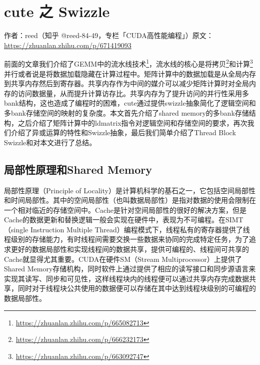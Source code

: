 \chapter{cute 之 Swizzle}

\begin{center}\small 作者：reed（知乎 @reed-84-49，专栏「CUDA高性能编程」）\quad 原文：\url{https://zhuanlan.zhihu.com/p/671419093}\end{center}

前面的文章我们介绍了GEMM中的流水线技术\footnote{\url{https://zhuanlan.zhihu.com/p/665082713}}，流水线的核心是将拷贝\footnote{\url{https://zhuanlan.zhihu.com/p/666232173}}和计算\footnote{\url{https://zhuanlan.zhihu.com/p/663092747}}并行或者说是将数据加载隐藏在计算过程中。矩阵计算中的数据加载是从全局内存到共享内存然后到寄存器。共享内存作为中间的媒介可以减少矩阵计算时对全局内存的访问数据量，从而提升计算访存比。共享内存为了提升访问的并行性采用多bank结构，这也造成了编程时的困难，cute通过提供swizzle抽象简化了逻辑空间和多bank存储空间的映射的复杂度。本文首先介绍了shared memory的多bank存储结构，之后介绍了矩阵计算中的ldmatrix指令对逻辑空间和存储空间的要求，再次我们介绍了异或运算的特性和Swizzle抽象，最后我们简单介绍了Thread Block Swizzle和对本文进行了总结。

\section{局部性原理和Shared Memory}

局部性原理（Principle of Locality）是计算机科学的基石之一，它包括空间局部性和时间局部性。其中的空间局部性（也叫数据局部性）是指对数据的使用会限制在一个相对临近的存储空间中。Cache是针对空间局部性的很好的解决方案，但是Cache的数据更新和替换逻辑一般会实现在硬件中，表现为不可编程。在SIMT（single Instruction Multiple Thread）编程模式下，线程私有的寄存器提供了线程级别的存储能力，有时线程间需要交换一些数据来协同的完成特定任务，为了追求更好的数据局部性和实现线程间的数据共享，提供可编程的、线程间可共享的Cache就显得尤其重要。CUDA在硬件SM（Stream Multiprocessor）上提供了Shared Memory存储机构，同时软件上通过提供了相应的读写接口和同步源语言来实现其读写、同步和可见性，这样线程块内的线程便可以通过共享内存完成数据共享，同时对于线程块公共使用的数据便可以存储在其中达到线程块级别的可编程的数据局部性。

